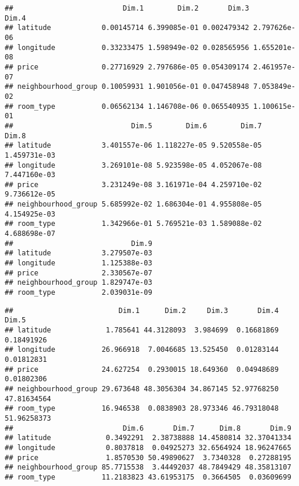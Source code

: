\documentclass[
]{article}
\newenvironment{Shaded}{\begin{snugshade}}{\end{snugshade}}
\newcommand{\CommentTok}[1]{\textcolor[rgb]{0.56,0.35,0.01}{\textit{#1}}}
\newcommand{\KeywordTok}[1]{\textcolor[rgb]{0.13,0.29,0.53}{\textbf{#1}}}
\newcommand{\NormalTok}[1]{#1}
\newcommand{\OperatorTok}[1]{\textcolor[rgb]{0.81,0.36,0.00}{\textbf{#1}}}
\begin{document}
\begin{Shaded}
\end{Shaded}

\begin{verbatim}
##                          Dim.1        Dim.2       Dim.3        Dim.4
## latitude            0.00145714 6.399085e-01 0.002479342 2.797626e-06
## longitude           0.33233475 1.598949e-02 0.028565956 1.655201e-08
## price               0.27716929 2.797686e-05 0.054309174 2.461957e-07
## neighbourhood_group 0.10059931 1.901056e-01 0.047458948 7.053849e-02
## room_type           0.06562134 1.146708e-06 0.065540935 1.100615e-01
##                            Dim.5        Dim.6        Dim.7        Dim.8
## latitude            3.401557e-06 1.118227e-05 9.520558e-05 1.459731e-03
## longitude           3.269101e-08 5.923598e-05 4.052067e-08 7.447160e-03
## price               3.231249e-08 3.161971e-04 4.259710e-02 9.736612e-05
## neighbourhood_group 5.685992e-02 1.686304e-01 4.955808e-05 4.154925e-03
## room_type           1.342966e-01 5.769521e-03 1.589088e-02 4.688698e-07
##                            Dim.9
## latitude            3.279507e-03
## longitude           1.125388e-03
## price               2.330567e-07
## neighbourhood_group 1.829747e-03
## room_type           2.039031e-09
\end{verbatim}

\begin{Shaded}
\end{Shaded}

\begin{verbatim}
##                         Dim.1      Dim.2     Dim.3       Dim.4       Dim.5
## latitude             1.785641 44.3128093  3.984699  0.16681869  0.18491926
## longitude           26.966918  7.0046685 13.525450  0.01283144  0.01812831
## price               24.627254  0.2930015 18.649360  0.04948689  0.01802306
## neighbourhood_group 29.673648 48.3056304 34.867145 52.97768250 47.81634564
## room_type           16.946538  0.0838903 28.973346 46.79318048 51.96258373
##                          Dim.6       Dim.7      Dim.8       Dim.9
## latitude             0.3492291  2.38738888 14.4580814 32.37041334
## longitude            0.8037818  0.04925273 32.6564924 18.96247665
## price                1.8570530 50.49890627  3.7340328  0.27288195
## neighbourhood_group 85.7715538  3.44492037 48.7849429 48.35813107
## room_type           11.2183823 43.61953175  0.3664505  0.03609699
\end{verbatim}
\end{document}
